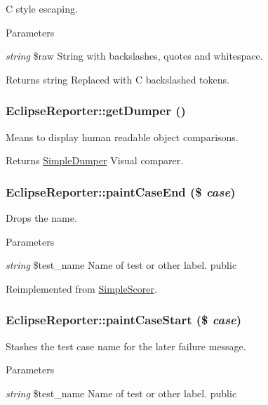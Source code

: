 \label{class_eclipse_reporter_a811324a8cd4e559d2f0c8dd12eafd0ac}
C style escaping. 
\begin{DoxyParams}{Parameters}
\item[{\em string}]\$raw String with backslashes, quotes and whitespace. \end{DoxyParams}
\begin{DoxyReturn}{Returns}
string Replaced with C backslashed tokens. 
\end{DoxyReturn}
\hypertarget{class_eclipse_reporter_a2aa6ddec17077eebcf3a02e7a64aa71a}{
\subsubsection[{getDumper}]{\setlength{\rightskip}{0pt plus 5cm}EclipseReporter::getDumper ()}}
\label{class_eclipse_reporter_a2aa6ddec17077eebcf3a02e7a64aa71a}
Means to display human readable object comparisons. \begin{DoxyReturn}{Returns}
\hyperlink{class_simple_dumper}{SimpleDumper} Visual comparer. 
\end{DoxyReturn}
\hypertarget{class_eclipse_reporter_a37e47c84707faeb87d1dcf946c1681f6}{
\subsubsection[{paintCaseEnd}]{\setlength{\rightskip}{0pt plus 5cm}EclipseReporter::paintCaseEnd (\$ {\em case})}}
\label{class_eclipse_reporter_a37e47c84707faeb87d1dcf946c1681f6}
Drops the name. 
\begin{DoxyParams}{Parameters}
\item[{\em string}]\$test\_\-name Name of test or other label.  public \end{DoxyParams}


Reimplemented from \hyperlink{class_simple_scorer_af61cf47c364d7fbe592714776e588e2a}{SimpleScorer}.\hypertarget{class_eclipse_reporter_a3417bc5902a1ca59ec14d64707cf15b2}{
\subsubsection[{paintCaseStart}]{\setlength{\rightskip}{0pt plus 5cm}EclipseReporter::paintCaseStart (\$ {\em case})}}
\label{class_eclipse_reporter_a3417bc5902a1ca59ec14d64707cf15b2}
Stashes the test case name for the later failure message. 
\begin{DoxyParams}{Parameters}
\item[{\em string}]\$test\_\-name Name of test or other label.  public \end{DoxyParams}


